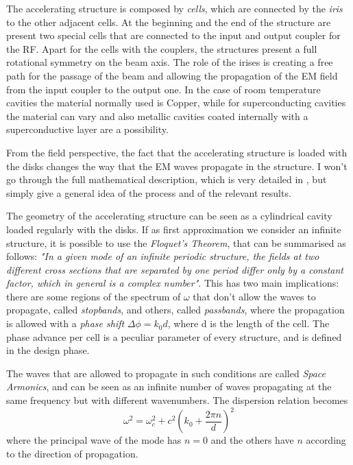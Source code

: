 The accelerating structure is composed by \textit{cells}, which are connected by the \textit{iris} to the other adjacent cells. At the beginning and the end of the structure are present two special cells that are connected to the input and output coupler for the RF. Apart for the cells with the couplers, the structures present a full rotational symmetry on the beam axis.
The role of the irises is creating a free path for the passage of the beam and allowing the propagation of the EM field from the input coupler to the output one. In the case of room temperature cavities the material normally used is Copper, while for superconducting cavities the material can vary and also metallic cavities coated internally with a superconductive layer are a possibility.

From the field perspective, the fact that the accelerating structure is loaded with the disks changes the way that the EM waves propagate in the structure. I won't go through the full mathematical description, which is very detailed in \cite{ Jackson:ClassEM,Weiss:261732}, but simply give a general idea of the process and of the relevant results.

The geometry of the accelerating structure can be seen as a cylindrical cavity loaded regularly with the disks. If as first approximation we consider an infinite structure, it is possible to use the \textit{Floquet's Theorem}, that can be summarised as follows: \textit{"In a given mode of an infinite periodic structure, the fields at two different cross sections that are separated by one period differ only by a constant factor, which in general is a complex number"}. This has two main implications: there are some regions of the spectrum of $\omega$ that don't allow the waves to propagate, called \textit{stopbands}, and others, called \textit{passbands}, where the propagation is allowed with a \textit{phase shift} $\Delta \phi = k_0 d$, where d is the length of the cell. The phase advance per cell is a peculiar parameter of every structure, and is defined in the design phase.

The waves that are allowed to propagate in such conditions are called \textit{Space Armonics}, and can be seen as an infinite number of waves propagating at the same frequency but with different wavenumbers. The dispersion relation becomes
\begin{equation}
\omega ^2 = \omega^2_c + c^2 \left( k_0 + \frac{2\pi n}{d} \right)^2
\end{equation}
where the principal wave of the mode has $n=0$ and the others have $n$ according to the direction of propagation.

